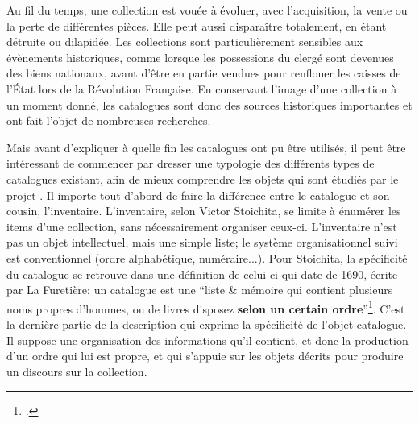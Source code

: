Au fil du temps, une collection est vouée à évoluer, avec l'acquisition, la vente ou la perte de différentes pièces. Elle peut aussi disparaître totalement, en étant détruite ou dilapidée. Les collections sont particulièrement sensibles aux évènements historiques, comme lorsque les possessions du clergé sont devenues des biens nationaux, avant d'être en partie vendues pour renflouer les caisses de l'État lors de la Révolution Française. En conservant l'image d'une collection à un moment donné, les catalogues sont donc des sources historiques importantes et ont fait l'objet de nombreuses recherches.

Mais avant d'expliquer à quelle fin les catalogues ont pu être utilisés, il peut être intéressant de commencer par dresser une typologie des différents types de catalogues existant, afin de mieux comprendre les objets qui sont étudiés par le projet \mssktb{}. Il importe tout d'abord de faire la différence entre le catalogue et son cousin, l'inventaire. L'inventaire, selon Victor Stoichita, se limite à énumérer les items d'une collection, sans nécessairement organiser ceux-ci. L'inventaire n'est pas un objet intellectuel, mais une simple liste; le système organisationnel suivi est conventionnel (ordre alphabétique, numéraire...). Pour Stoichita, la spécificité du catalogue se retrouve dans une définition de celui-ci qui date de 1690, écrite par La Furetière: un catalogue est une \enquote{liste \& mémoire qui contient plusieurs noms propres d'hommes, ou de livres disposez \textbf{selon un certain ordre}}\footcite[p. 122, le gras est ajouté par moi-même]{stoichita_instauration_1993}. C'est la dernière partie de la description qui exprime la spécificité de l'objet catalogue. Il suppose une organisation des informations qu'il contient, et donc la production d'un ordre qui lui est propre, et qui s'appuie sur les objets décrits pour produire un discours sur la collection.

